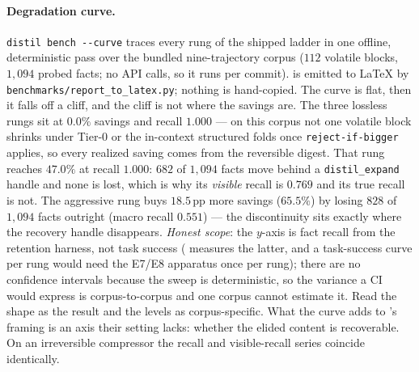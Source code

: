 \documentclass{article}
\begin{document}
\paragraph{Degradation curve.} \texttt{distil bench -{}-curve} traces every rung of the
shipped ladder in one offline, deterministic pass over the bundled nine-trajectory corpus
($112$ volatile blocks, $1{,}094$ probed facts; no API calls, so it runs per commit).
 is emitted to LaTeX by \texttt{benchmarks/report\_to\_latex.py}; nothing is
hand-copied. The curve is flat, then it falls off a cliff, and the cliff is not where the
savings are. The three lossless rungs sit at $0.0\%$ savings and recall $1.000$ --- on this
corpus not one volatile block shrinks under Tier-0 or the in-context structured folds once
\texttt{reject-if-bigger} applies, so every realized saving comes from the reversible digest.
That rung reaches $47.0\%$ at recall $1.000$: $682$ of $1{,}094$ facts move behind a
\texttt{distil\_expand} handle and none is lost, which is why its \emph{visible} recall is
$0.769$ and its true recall is not. The aggressive rung buys $18.5$\,pp more savings
($65.5\%$) by losing $828$ of $1{,}094$ facts outright (macro recall $0.551$) --- the
discontinuity sits exactly where the recovery handle disappears. \emph{Honest scope}: the
$y$-axis is fact recall from the retention harness, not task success
(\cite{controlcompression} measures the latter, and a task-success curve per rung would need
the E7/E8 apparatus once per rung); there are no confidence intervals because the sweep is
deterministic, so the variance a CI would express is corpus-to-corpus and one corpus cannot
estimate it. Read the shape as the result and the levels as corpus-specific. What the curve
adds to \cite{controlcompression}'s framing is an axis their setting lacks: whether the
elided content is recoverable. On an irreversible compressor the recall and visible-recall
series coincide identically.

\end{document}
